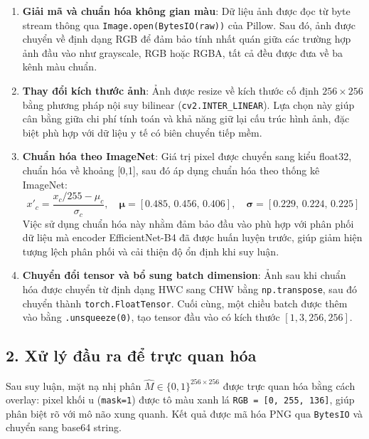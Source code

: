 \begin{sloppypar}
\begin{enumerate}
    \item \textbf{Giải mã và chuẩn hóa không gian màu}: Dữ liệu ảnh được đọc từ byte stream thông qua \texttt{Image.open(BytesIO(raw))} của Pillow. Sau đó, ảnh được chuyển về định dạng RGB để đảm bảo tính nhất quán giữa các trường hợp ảnh đầu vào như grayscale, RGB hoặc RGBA, tất cả đều được đưa về ba kênh màu chuẩn.

    \item \textbf{Thay đổi kích thước ảnh}: Ảnh được resize về kích thước cố định $256 \times 256$ bằng phương pháp nội suy bilinear (\texttt{cv2.INTER\_LINEAR}). Lựa chọn này giúp cân bằng giữa chi phí tính toán và khả năng giữ lại cấu trúc hình ảnh, đặc biệt phù hợp với dữ liệu y tế có biên chuyển tiếp mềm.

    \item \textbf{Chuẩn hóa theo ImageNet}: Giá trị pixel được chuyển sang kiểu float32, chuẩn hóa về khoảng [0,1], sau đó áp dụng chuẩn hóa theo thống kê ImageNet:
    \begin{equation}
        x'_c = \frac{x_c / 255 - \mu_c}{\sigma_c}, \quad
        \boldsymbol{\mu} = [0.485,\,0.456,\,0.406], \quad
        \boldsymbol{\sigma} = [0.229,\,0.224,\,0.225]
        \label{eq:imagenet_norm}
    \end{equation}
    Việc sử dụng chuẩn hóa này nhằm đảm bảo đầu vào phù hợp với phân phối dữ liệu mà encoder EfficientNet-B4 đã được huấn luyện trước, giúp giảm hiện tượng lệch phân phối và cải thiện độ ổn định khi suy luận.

    \item \textbf{Chuyển đổi tensor và bổ sung batch dimension}: Ảnh sau khi chuẩn hóa được chuyển từ định dạng HWC sang CHW bằng \texttt{np.transpose}, sau đó chuyển thành \texttt{torch.FloatTensor}. Cuối cùng, một chiều batch được thêm vào bằng \texttt{.unsqueeze(0)}, tạo tensor đầu vào có kích thước $[1, 3, 256, 256]$.
\end{enumerate}
\end{sloppypar}

\subsection*{2. Xử lý đầu ra để trực quan hóa}

Sau suy luận, mặt nạ nhị phân $\hat{M} \in \{0,1\}^{256\times256}$ được trực quan hóa bằng cách overlay: pixel khối u (\texttt{mask=1}) được tô màu xanh lá \texttt{RGB = [0, 255, 136]}, giúp phân biệt rõ với mô não xung quanh. Kết quả được mã hóa PNG qua \texttt{BytesIO} và chuyển sang base64 string.

